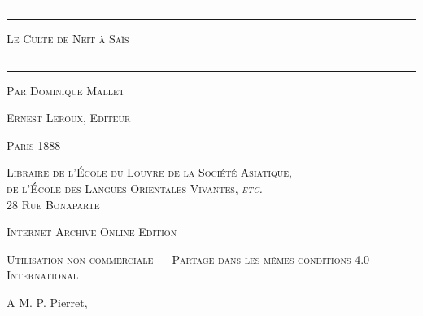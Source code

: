 \documentclass[a4paper, 11pt, oneside]{article}
\begin{document}
\begin{titlepage} %
	\centering %

	
	\rule{\textwidth}{1.6pt}\vspace*{-\baselineskip}\vspace*{2pt} %
	\rule{\textwidth}{0.4pt} %
	
	\vspace{1\baselineskip} %
	
	{\scshape\Huge Le Culte de Neit à Saïs}
	
	\vspace{1\baselineskip} %

	\rule{\textwidth}{0.4pt}\vspace*{-\baselineskip}\vspace{3.2pt} %
	\rule{\textwidth}{1.6pt} %
	
	\vspace{1\baselineskip} %
	
	
	{\scshape \Large Par Dominique Mallet} %
	
	\vspace*{1\baselineskip} %
	
        {\scshape\scriptsize Ernest Leroux, Editeur} %
    
        \vspace*{\fill}

	\vspace{1\baselineskip}

	{\small\scshape Paris 1888}
	
	{\small\scshape{Libraire de l'École du Louvre de la Société Asiatique,\\ de l'École des Langues Orientales Vivantes, \emph{etc.} \\ 28 Rue Bonaparte}}
	
	\vspace{0.5\baselineskip} %

        \scshape Internet Archive Online Edition  %
	
	{\scshape\small Utilisation non commerciale --- Partage dans les mêmes conditions 4.0 International} %
\end{titlepage}
\setlength{\parskip}{1mm plus1mm minus1mm}
\clearpage
\tableofcontents
\clearpage
\vspace*{\fill}
A M. P. Pierret,
\end{document}
